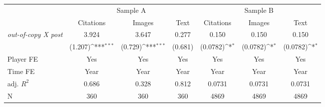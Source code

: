 {
\def\sym#1{\ifmmode^{#1}\else\(^{#1}\)\fi}
\begin{tabular*}{\hsize}{@{\hskip\tabcolsep\extracolsep\fill}l*{6}{c}}
\toprule
            &\multicolumn{3}{c}{Sample A}                                     &\multicolumn{3}{c}{Sample B}                                     \\\cmidrule(lr){2-4}\cmidrule(lr){5-7}
            &\multicolumn{1}{c}{Citations}&\multicolumn{1}{c}{Images}&\multicolumn{1}{c}{Text}&\multicolumn{1}{c}{Citations}&\multicolumn{1}{c}{Images}&\multicolumn{1}{c}{Text}\\
\midrule
\emph{out-of-copy X post}&       3.924         &       3.647         &       0.277         &       0.150         &       0.150         &       0.150         \\
            &     (1.207)\sym{***}&     (0.729)\sym{***}&     (0.681)         &    (0.0782)\sym{*}  &    (0.0782)\sym{*}  &    (0.0782)\sym{*}  \\
\midrule
Player FE   &         Yes         &         Yes         &         Yes         &         Yes         &         Yes         &         Yes         \\
Time FE     &        Year         &        Year         &        Year         &        Year         &        Year         &        Year         \\
adj. $R^2$  &       0.686         &       0.328         &       0.812         &      0.0731         &      0.0731         &      0.0731         \\
N           &         360         &         360         &         360         &        4869         &        4869         &        4869         \\
\bottomrule
\end{tabular*}
}
